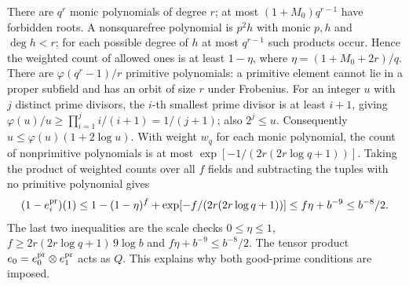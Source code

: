 There are \(q^r\) monic polynomials of degree \(r\); at most
\((1+M_0)q^{r-1}\) have forbidden roots. A nonsquarefree
polynomial is \(p^2h\) with monic \(p,h\) and \(\deg h<r\);
for each possible degree of \(h\) at most \(q^{r-1}\) such
products occur. Hence the weighted count of allowed ones is
at least \(1-\eta\), where \(\eta=(1+M_0+2r)/q\).
There are \(\varphi(q^r-1)/r\) primitive polynomials: a primitive
element cannot lie in a proper subfield and has an orbit of
size \(r\) under Frobenius.
For an integer \(u\) with \(j\) distinct prime divisors, the
\(i\)-th smallest prime divisor is at least \(i+1\), giving
\(\varphi(u)/u\ge\prod_{i=1}^j i/(i+1)=1/(j+1)\);
also \(2^j\le u\). Consequently
\(u\le\varphi(u)(1+2\log u)\). With weight \(w_q\) for each monic polynomial, the count of nonprimitive polynomials is at most
\(\exp[-1/(2r(2r\log q+1))]\).
Taking the product of weighted counts over all \(f\) fields
and subtracting the tuples with no primitive polynomial gives
\[
 (1-e_i^{\rm pr})(1)\le1-(1-\eta)^f+
   \exp[-f/(2r(2r\log q+1))]\le f\eta+b^{-9}\le b^{-8}/2.
\]
The last two inequalities are the scale checks
\(0\le\eta\le1\), \(f\ge 2r(2r\log q+1)\,9\log b\) and
\(f\eta+b^{-9}\le b^{-8}/2\). The tensor product
\(e_0=e_0^{\rm pr}\otimes e_1^{\rm pr}\) acts as \(Q\).
This explains why both good-prime conditions are imposed.

